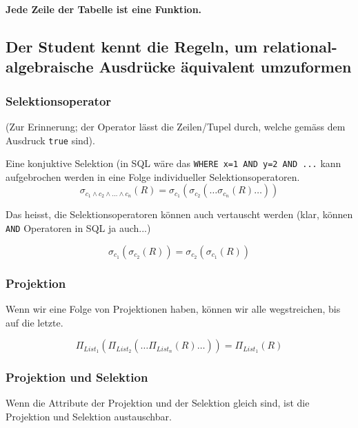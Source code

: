 \begin{center}
	\textbf{Jede Zeile der Tabelle ist eine Funktion.}
\end{center}

\subsection{Der Student kennt die Regeln, um relational-algebraische Ausdrücke äquivalent umzuformen}
\label{sec:umformung}

\subsubsection{Selektionsoperator}
(Zur Erinnerung; der Operator lässt die Zeilen/Tupel durch, welche gemäss dem Ausdruck \texttt{true} sind).

Eine konjuktive Selektion (in SQL wäre das \texttt{WHERE x=1 AND y=2 AND ...} kann aufgebrochen werden in eine Folge individueller Selektionsoperatoren.
\begin{equation}\label{konjuktive_selektion}
  \sigma _{c_1\wedge c_2 \wedge \dots \wedge c_n} (R) = \sigma _{c_1} (\sigma _{c_2}(\dots \sigma _{c_n} (R) \dots ))
\end{equation}

Das heisst, die Selektionsoperatoren können auch vertauscht werden (klar, können \texttt{AND} Operatoren in SQL ja auch...)

\begin{equation}
  \sigma _{c_1} (\sigma _{c_2} (R)) =  \sigma _{c_2} (\sigma _{c_1} (R)) 
\end{equation}

\subsubsection{Projektion}
Wenn wir eine Folge von Projektionen haben, können wir alle wegstreichen, bis auf die letzte.

\begin{equation*}
  \Pi _{List_1} ( \Pi _{List_2} ( \dots \Pi _{List_n} (R) \dots )) = \Pi _{List_1} (R)
\end{equation*}

\subsubsection{Projektion und Selektion}
Wenn die Attribute der Projektion und der Selektion gleich sind, ist die Projektion und Selektion austauschbar.

